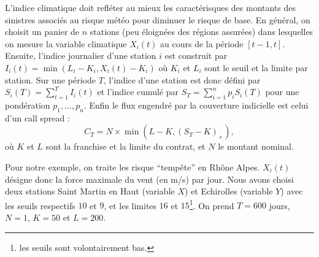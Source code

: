\documentclass[11pt,a4paper]{article}
\begin{document}
L'indice climatique doit refl\'eter au mieux les caract\'erisques des montants des sinistres associ\'es au risque m\'et\'eo pour diminuer
le risque de base. En g\'en\'eral, on choisit un panier de $n$ stations (peu \'eloign\'ees des r\'egions assur\'ees) dans lesquelles on 
mesure la variable climatique $X_i(t)$ au cours de la p\'eriode $[t-1,t]$. Ensuite, l'indice journalier d'une station $i$ est construit
par $I_i(t) = \min(L_i-K_i, X_i(t) - K_i)$ o\`u $K_i$ et $L_i$ sont le seuil et la limite par station. Sur une p\'eriode $T$, l'indice d'une station 
est donc d\'efini par $S_i(T) = \sum_{t=1}^T I_i(t)$ et l'indice cumul\'e par $S_T =  \sum_{i=1}^n p_i S_i(T)$ pour une pond\'eration 
$p_1, \dots, p_n$. Enfin le flux engendr\'e par la couverture indicielle est celui d'un call spread : $$C_T = N \times 
\min\left(L-K, \left(S_T-K\right)_+\right),$$
o\`u $K$ et $L$ sont la franchise et la limite du contrat, et $N$ le montant nominal.

Pour notre exemple, on traite les risque ``temp\^ete'' en Rh\^one Alpes. $X_i(t)$ d\'esigne donc la force maximale du vent (en m/s) par jour.
Nous avons choisi deux stations Saint Martin en Haut (variable $X$) et Echirolles (variable $Y$) avec les seuils respectifs $10$ et $9$, et les limites $16$ et $15$\footnote{les seuils sont volontairement bas.}. On prend $T=600$ jours, $N=1$, $K=50$ et $L=200$.
\end{document}
